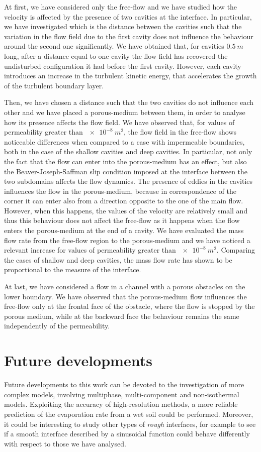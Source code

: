 At first, we have considered only the free-flow and we have studied how the 
velocity is affected by the presence of two cavities at the interface.
In particular, we have investigated which is the distance between the cavities such that the variation in the flow field 
due to the first cavity does not influence the 
behaviour around the second one significantly.
We have obtained that, for cavities $\SI{0.5}{m}$ long, after a 
distance equal to one cavity the flow field has recovered the undisturbed configuration it 
had before the first cavity. However, each cavity introduces an increase in the 
turbulent kinetic energy, that accelerates the growth of the turbulent 
boundary layer.

Then, we have chosen a distance such that the two cavities do not 
influence each other and we have placed a porous-medium between them, in order 
to analyse how its presence affects the flow field. We have observed that, 
for values of permeability greater than $\SI{e-8}{m^2}$, the flow field in the 
free-flow shows noticeable differences when compared to a case with impermeable boundaries, both in the case of the shallow cavities and deep cavities.
In particular, not only the fact that the flow can enter into 
the porous-medium has an effect, but also the Beaver-Joseph-Saffman slip 
condition imposed at the interface between the two subdomains affects the flow dynamics.
The presence of eddies in the cavities influences the flow in the 
porous-medium, because in correspondence of the corner it can enter also 
from a direction opposite to the one of the main flow. However, when this 
happens, the values of the velocity are relatively small and thus this 
behaviour does not affect the free-flow as it happens when the flow enters the 
porous-medium at the end of a cavity. We have evaluated the mass flow 
rate from the free-flow region to the porous-medium and we have noticed a 
relevant 
increase for values of permeability greater than $\SI{e-8}{m^2}$. Comparing 
the cases of shallow and deep cavities, the mass flow rate has shown to be 
proportional to the measure of the interface.

At last, we have considered a flow in a channel with a porous obstacles on the 
lower boundary. We have observed that the porous-medium flow influences the 
free-flow only at the frontal face of the obstacle, where the flow is stopped 
by the porous medium, while at the backward face the behaviour remains the same 
independently of the permeability.
%
\section{Future developments}
Future developments to this work can be devoted to the investigation of more 
complex models, involving multiphase, multi-component and non-isothermal 
models. Exploiting the accuracy of high-resolution methods, a more reliable 
prediction of the evaporation rate from a wet soil could be performed. 
Moreover, it could be interesting to study other types of \emph{rough} 
interfaces, for example to see if a smooth interface described by a sinusoidal 
function could behave differently with respect to those we have analysed.

